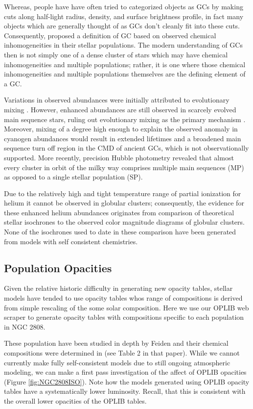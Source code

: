 Whereas, people have have often tried to categorized objects as GCs by making
cuts along half-light radius, density, and surface brightness profile, in fact
many objects which are generally thought of as GCs don't cleanly fit into these
cuts. Consequently, \citet{Carretta2010} proposed a definition of GC based on
observed chemical inhomogeneities in their stellar populations. The modern
understanding of GCs then is not simply one of a dense cluster of stars which
may have chemical inhomogeneities and multiple populations; rather, it is one
where those chemical inhomogeneities and multiple populations themselves are
the defining element of a GC.

Variations in observed abundances were initially attributed to evolutionary
mixing \citep{Denisenkov1990}. However, enhanced abundances are still observed
in scarcely evolved main sequence stars, ruling out evolutionary mixing as the
primary mechanism \citep{Gratton2004,Briley2004}. Moreover, mixing of a degree
high enough to explain the observed anomaly in cyanogen abundances would result
in extended lifetimes and a broadened main sequence turn off region in the CMD
of ancient GCs, which is not observationally supported. More recently,
precision Hubble photometry revealed that almost every cluster in orbit of the
milky way comprises multiple main sequences \citep{Piotto2007, Roh2011,
Milone2012} (MP) as opposed to a single stellar population (SP).

Due to the relatively high and tight temperature range of partial ionization
for helium it cannot be observed in globular clusters; consequently, the
evidence for these enhanced helium abundances originates from comparison of
theoretical stellar isochrones to the observed color magnitude diagrams of
globular clusters. None of the isochrones used to date in these comparison have
been generated from models with self consistent chemistries. 

\subsection{Population Opacities}
Given the relative historic difficulty in generating new opacity tables,
stellar models have tended to use opacity tables whos range of compositions is
derived from simple rescaling of the some solar composition. Here we use our
OPLIB web scraper to generate opacity tables with compositions specific to each
population in NGC 2808.

These population have been studied in depth by Feiden and their chemical
compositions were determined in \citet{Milone2015} (see Table 2 in that paper).
While we cannot currently make fully self-consistent models due to still
ongoing atmospheric modeling, we can make a first pass investigation of the
affect of OPLIB opacities (Figure \ref{fig:NGC2808ISO}). Note how the models
generated using OPLIB opacity tables have a systematically lower luminosity.
Recall, that this is consistent with the overall lower opacities of the OPLIB
tables.

